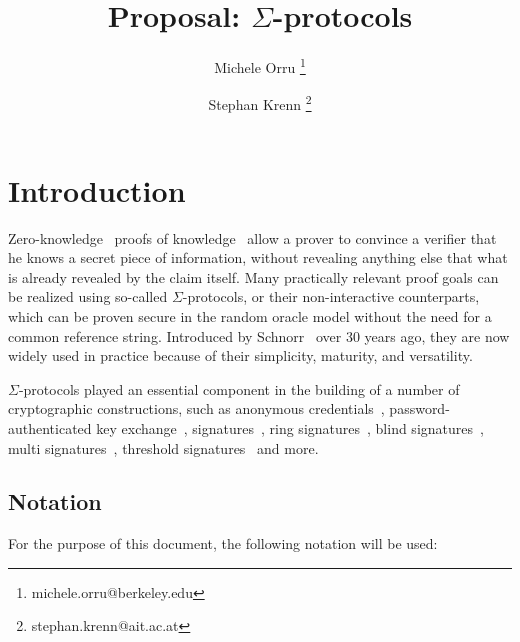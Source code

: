 \documentclass[runningheads,11pt]{article}
\title{Proposal: $\Sigma$-protocols}
\author{Michele Orru \thanks{michele.orru@berkeley.edu} \and Stephan Krenn
\thanks{stephan.krenn@ait.ac.at}
}
\begin{document}
%
\maketitle              %
%
{\hypersetup{hidelinks} \tableofcontents}

\section{Introduction}

Zero-knowledge~\cite{GolMicRac89} proofs of knowledge~\cite{C:BelGol92} allow a prover to convince a verifier that he knows a secret piece of information, without revealing anything else that what is already revealed by the claim itself.
Many practically relevant proof goals can be realized using so-called $\Sigma$-protocols, or their non-interactive counterparts, which can be proven secure in the random oracle model without the need for a common reference string.
Introduced by Schnorr~\cite{JC:Schnorr91} over 30 years ago, they are now widely used  in practice because of their simplicity, maturity, and versatility.

$\Sigma$-protocols played an essential component in the building of a number of cryptographic
constructions,
such as anonymous credentials~\cite{CCS:ChaMeiZav14}, password-authenticated key exchange~\cite{jpake}, signatures~\cite{C:Schnorr89},
ring signatures~\cite{borromeansig}, blind signatures~\cite{CCS:PoiSte97}, multi signatures~\cite{CCS:NRSW20}, threshold signatures~\cite{EPRINT:KomGol20} and more.
\subsection{Notation}
\label{sec:notation}

For the purpose of this document, the following notation will be used:
\end{document}
